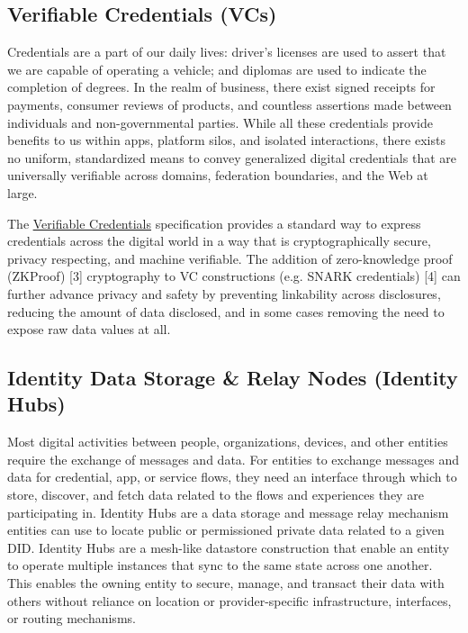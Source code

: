 \documentclass[11pt]{article}
\begin{document}
\subsection{Verifiable Credentials (VCs)}

\vspace{1\baselineskip}
Credentials are a part of our daily lives: driver's licenses are used to assert that we are capable of operating a vehicle; and diplomas are used to indicate the completion of degrees. In the realm of business, there exist signed receipts for payments, consumer reviews of products, and countless assertions made between individuals and non-governmental parties. While all these credentials provide benefits to us within apps, platform silos, and isolated interactions, there exists no uniform, standardized means to convey generalized digital credentials that are universally verifiable across domains, federation boundaries, and the Web at large.

\vspace{1\baselineskip}
The \href{https://www.w3.org/TR/vc-data-model/}{\uline{\textcolor[HTML]{1155CC}{Verifiable Credentials}}} specification provides a standard way to express credentials across the digital world in a way that is cryptographically secure, privacy respecting, and machine verifiable. The addition of zero-knowledge proof (ZKProof) [3] cryptography to VC constructions (e.g. SNARK credentials) [4] can further advance privacy and safety by preventing linkability across disclosures, reducing the amount of data disclosed, and in some cases removing the need to expose raw data values at all.

\vspace{1\baselineskip}
\subsection{Identity Data Storage & Relay Nodes (Identity Hubs)}

\vspace{1\baselineskip}
Most digital activities between people, organizations, devices, and other entities require the exchange of messages and data. For entities to exchange messages and data for credential, app, or service flows, they need an interface through which to store, discover, and fetch data related to the flows and experiences they are participating in. Identity Hubs are a data storage and message relay mechanism entities can use to locate public or permissioned private data related to a given DID. Identity Hubs are a mesh-like datastore construction that enable an entity to operate multiple instances that sync to the same state across one another. This enables the owning entity to secure, manage, and transact their data with others\textcolor[HTML]{202124}{ }without reliance on location or provider-specific infrastructure, interfaces, or routing mechanisms.
\end{document}
